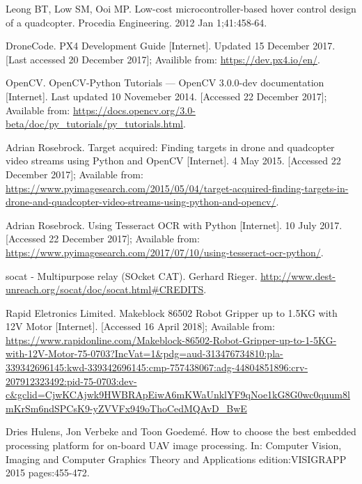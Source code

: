 \documentclass[11pt,twoside]{article}
\begin{document}
\begin{thebibliography}{11}
    Leong BT, Low SM, Ooi MP. Low-cost microcontroller-based hover control design of a quadcopter. Procedia Engineering. 2012 Jan 1;41:458-64.

    DroneCode. PX4 Development Guide [Internet]. Updated 15 December 2017. [Last accessed 20 December 2017]; Availible from: \url{https://dev.px4.io/en/}.

    OpenCV. OpenCV-Python Tutorials — OpenCV 3.0.0-dev documentation [Internet]. Last updated 10 Novemeber 2014. [Accessed 22 December 2017]; Available from: \url{https://docs.opencv.org/3.0-beta/doc/py_tutorials/py_tutorials.html}.

    Adrian Rosebrock. Target acquired: Finding targets in drone and quadcopter video streams using Python and OpenCV [Internet]. 4 May 2015. [Accessed 22 December 2017]; Available from: \url{https://www.pyimagesearch.com/2015/05/04/target-acquired-finding-targets-in-drone-and-quadcopter-video-streams-using-python-and-opencv/}.

    Adrian Rosebrock. Using Tesseract OCR with Python [Internet]. 10 July 2017. [Accessed 22 December 2017]; Available from: \url{https://www.pyimagesearch.com/2017/07/10/using-tesseract-ocr-python/}.

    socat - Multipurpose relay (SOcket CAT). Gerhard Rieger. \url{http://www.dest-unreach.org/socat/doc/socat.html#CREDITS}.

    Rapid Eletronics Limited. Makeblock 86502 Robot Gripper up to 1.5KG with 12V Motor [Internet]. [Accessed 16 April 2018]; Available from: \url{https://www.rapidonline.com/Makeblock-86502-Robot-Gripper-up-to-1-5KG-with-12V-Motor-75-0703?IncVat=1&pdg=aud-313476734810:pla-339342696145:kwd-339342696145:cmp-757438067:adg-44804851896:crv-207912323492:pid-75-0703:dev-c&gclid=CjwKCAjwk9HWBRApEiwA6mKWaUnklYF9qNoe1kG8G0wc0quum8lmKrSm6ndSPCsK9-yZVVFx949oThoCedMQAvD_BwE}

    Dries Hulens, Jon Verbeke and Toon Goedem\'e. How to choose the best embedded processing platform for on-board UAV image processing. In: Computer Vision, Imaging and Computer Graphics Theory and Applications edition:VISIGRAPP 2015 pages:455-472.

\end{thebibliography}
\end{document}
